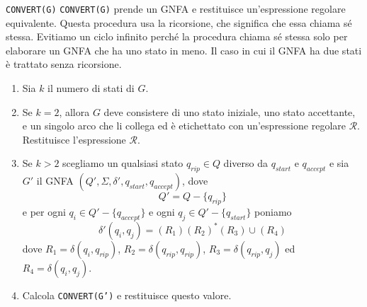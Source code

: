 \begin{Algoritmo}{\texttt{CONVERT(G)}}{}\label{alg:convert}
\texttt{CONVERT(G)} prende un GNFA e restituisce un'espressione regolare equivalente. Questa procedura usa la ricorsione, che significa che essa chiama sé stessa. Evitiamo un ciclo infinito perché la procedura chiama sé stessa solo per elaborare un GNFA che ha uno stato in meno. Il caso in cui il GNFA ha due stati è trattato senza ricorsione.

\begin{enumerate}
    \item Sia $k$ il numero di stati di $G$.
    \item Se $k = 2$, allora $G$ deve consistere di uno stato iniziale, uno stato accettante, e un singolo arco che li collega ed è etichettato con un'espressione regolare $\mathcal{R}$. Restituisce l'espressione $\mathcal{R}$.
    \item Se $k > 2$ scegliamo un qualsiasi stato $q_{rip} \in Q$ diverso da $q_{start}$ e $q_{accept}$ e sia $G'$ il GNFA $(Q',\Sigma, \delta', q_{start}, q_{accept})$, dove 
    \begin{equation*}
        Q'=Q-\{q_{rip}\}
    \end{equation*} 
    e per ogni $q_i \in Q' -\{q_{accept}\}$ e ogni $q_j \in Q'-\{q_{start}\}$ poniamo 
    \begin{equation*}
        \delta'(q_{i}, q_{j})=(R_1)(R_2)^*(R_3)\cup(R_4)    
    \end{equation*}
    dove $R_1 = \delta(q_{i}, q_{rip})$, $R_2=\delta(q_{rip}, q_{rip})$, $R_3 = \delta(q_{rip}, q_j)$ ed $R_{4} = \delta(q_{i}, q_{j})$.
    \item Calcola \texttt{CONVERT(G')} e restituisce questo valore.
\end{enumerate}
\end{Algoritmo}


